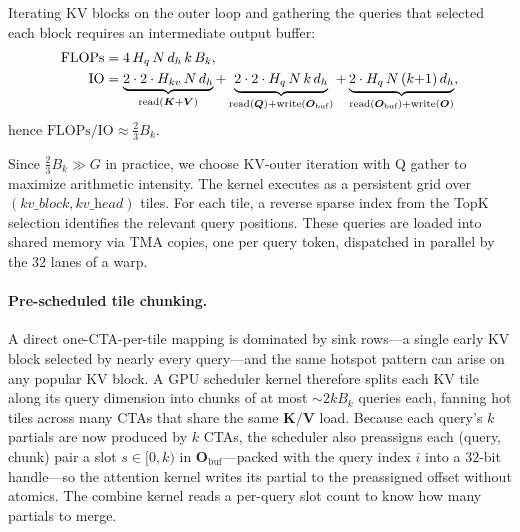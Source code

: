 Iterating KV blocks on the outer loop and gathering the queries that selected each block requires an intermediate output buffer:
\begin{align}
\mathrm{FLOPs} &= 4\, H_q\, N\, d_h\, k\, B_k, \\
\mathrm{IO}    &= \underbrace{2 \cdot 2 \cdot H_{kv}\, N\, d_h}_{\text{read}({\bm{K}}+{\bm{V}})}
                + \underbrace{2 \cdot 2 \cdot H_q\, N\, k\, d_h}_{\text{read}({\bm{Q}})+\text{write}({\bm{O}}_\text{buf})}
                + \underbrace{2 \cdot H_q\, N\, (k{+}1)\, d_h}_{\text{read}({\bm{O}}_\text{buf})+\text{write}({\bm{O}})},
\end{align}
hence $\mathrm{FLOPs}/\mathrm{IO} \approx \tfrac{2}{3} B_k$.

Since $\tfrac{2}{3} B_k \gg G$ in practice, we choose KV-outer iteration with Q gather to maximize arithmetic intensity. The kernel executes as a persistent grid over $(\textit{kv\_block}, \textit{kv\_head})$ tiles. For each tile, a reverse sparse index from the TopK selection identifies the relevant query positions. These queries are loaded into shared memory via TMA copies, one per query token, dispatched in parallel by the 32 lanes of a warp.

\paragraph{Pre-scheduled tile chunking.}
A direct one-CTA-per-tile mapping is dominated by sink rows---a single early KV block selected by nearly every query---and the same hotspot pattern can arise on any popular KV block. A GPU scheduler kernel therefore splits each KV tile along its query dimension into chunks of at most $\sim\!2 k B_k$ queries each, fanning hot tiles across many CTAs that share the same $\mathbf{K}/\mathbf{V}$ load.
Because each query's $k$ partials are now produced by $k$ CTAs, the scheduler also preassigns each (query, chunk) pair a slot $s \in [0, k)$ in $\mathbf{O}_\text{buf}$---packed with the query index $i$ into a $32$-bit handle---so the attention kernel writes its partial to the preassigned offset without atomics. The combine kernel reads a per-query slot count to know how many partials to merge.

